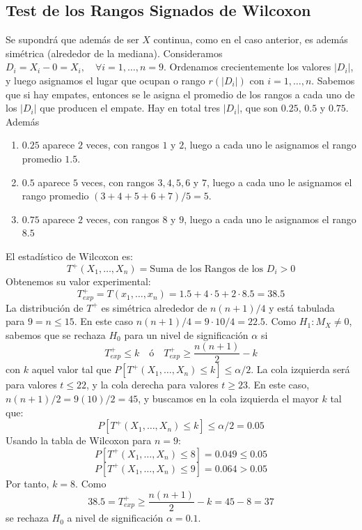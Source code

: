 \documentclass[12pt]{article}
\begin{document}
\begin{ejercicio}[1,1 puntos]
        \section*{Test de los Rangos Signados de Wilcoxon}

        Se supondrá que además de ser $X$ continua, como en el caso anterior, es además simétrica (alrededor de la mediana).
        Consideramos $D_i = X_i - 0 = X_i, \quad \forall i = 1, \ldots, n=9$. Ordenamos crecientemente los valores
        $|D_i|$, y luego asignamos el lugar que ocupan o rango $r(|D_i|)$ con $i=1, \ldots, n$. Sabemos que 
        si hay empates, entonces se le asigna el promedio de los rangos a cada uno de los $|D_i|$ que producen el empate.
        Hay en total tres $|D_i|$, que son $0{.}25$, $0{.}5$ y $0{.}75$. Además
        \begin{enumerate}
            \item $0{.}25$ aparece $2$ veces, con rangos $1$ y $2$, luego a cada uno le asignamos el rango promedio $1.5$.
            \item $0{.}5$ aparece $5$ veces, con rangos $3,4,5,6$ y $7$, luego a cada uno le asignamos el rango promedio 
            $(3+4+5+6+7)/5 = 5$.
            \item $0{.}75$ aparece $2$ veces, con rangos $8$ y $9$, luego a cada uno le asignamos el rango $8.5$
        \end{enumerate}
        El estadístico de Wilcoxon es:
        $$T^{+}(X_1, \ldots, X_n) = \text{Suma de los Rangos de los $D_i > 0$}$$
        Obtenemos su valor experimental:
        $$T_{exp}^{+} = T(x_1, \ldots, x_n) = 1.5 + 4 \cdot 5 + 2 \cdot 8.5 = 38.5$$
        La distribución de $T^{+}$ es simétrica alrededor de $n(n+1)/4$ y está tabulada para $9 = n \leqslant 15$.
        En este caso $n(n+1)/4 = 9 \cdot 10 / 4 = 22.5$. Como $H_1 : M_X \neq 0$, 
        sabemos que se rechaza $H_0$ para un nivel de significación $\alpha$ si
        $$T^{+}_{exp} \leqslant k \quad \text{ó} \quad T^{+}_{exp} \geqslant \dfrac{n(n+1)}{2} - k$$
        con $k$ aquel valor tal que $P[T^{+}(X_1, \ldots, X_n) \leqslant k] \leqslant \alpha/2$.
        La cola izquierda será para valores $t \leqslant 22$, y la cola derecha para valores $t \geqslant 23$.
        En este caso, $n(n+1)/2 = 9(10)/2 = 45$, y buscamos en la cola izquierda el mayor $k$ tal que:
        $$P[T^{+}(X_1, \ldots, X_n) \leqslant k] \leqslant \alpha/2 = 0.05$$
        Usando la tabla de Wilcoxon para $n=9$:
        $$P[T^{+}(X_1, \ldots, X_n) \leqslant 8] = 0.049 \leqslant 0.05$$
        $$P[T^{+}(X_1, \ldots, X_n) \leqslant 9] = 0.064 > 0.05$$
        Por tanto, $k=8$. Como 
        $$38.5 = T^{+}_{exp} \geqslant \dfrac{n(n+1)}{2} - k = 45 - 8 = 37$$
        se rechaza $H_0$ a nivel de significación $\alpha = 0.1$.
    \end{ejercicio}
\end{document}
